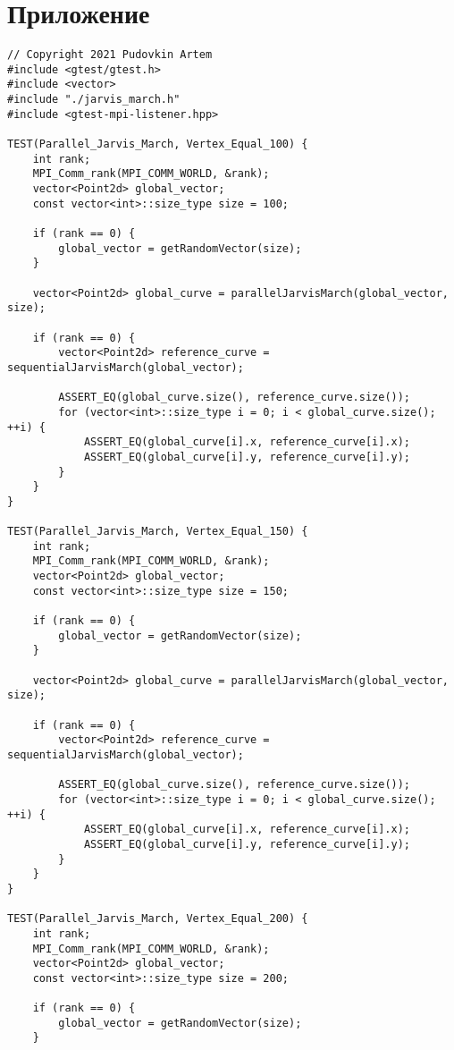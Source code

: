 \documentclass{report}
\begin{document}
\section*{Приложение}
\begin{lstlisting}
// Copyright 2021 Pudovkin Artem
#include <gtest/gtest.h>
#include <vector>
#include "./jarvis_march.h"
#include <gtest-mpi-listener.hpp>

TEST(Parallel_Jarvis_March, Vertex_Equal_100) {
    int rank;
    MPI_Comm_rank(MPI_COMM_WORLD, &rank);
    vector<Point2d> global_vector;
    const vector<int>::size_type size = 100;

    if (rank == 0) {
        global_vector = getRandomVector(size);
    }

    vector<Point2d> global_curve = parallelJarvisMarch(global_vector, size);

    if (rank == 0) {
        vector<Point2d> reference_curve = sequentialJarvisMarch(global_vector);

        ASSERT_EQ(global_curve.size(), reference_curve.size());
        for (vector<int>::size_type i = 0; i < global_curve.size(); ++i) {
            ASSERT_EQ(global_curve[i].x, reference_curve[i].x);
            ASSERT_EQ(global_curve[i].y, reference_curve[i].y);
        }
    }
}

TEST(Parallel_Jarvis_March, Vertex_Equal_150) {
    int rank;
    MPI_Comm_rank(MPI_COMM_WORLD, &rank);
    vector<Point2d> global_vector;
    const vector<int>::size_type size = 150;

    if (rank == 0) {
        global_vector = getRandomVector(size);
    }

    vector<Point2d> global_curve = parallelJarvisMarch(global_vector, size);

    if (rank == 0) {
        vector<Point2d> reference_curve = sequentialJarvisMarch(global_vector);

        ASSERT_EQ(global_curve.size(), reference_curve.size());
        for (vector<int>::size_type i = 0; i < global_curve.size(); ++i) {
            ASSERT_EQ(global_curve[i].x, reference_curve[i].x);
            ASSERT_EQ(global_curve[i].y, reference_curve[i].y);
        }
    }
}

TEST(Parallel_Jarvis_March, Vertex_Equal_200) {
    int rank;
    MPI_Comm_rank(MPI_COMM_WORLD, &rank);
    vector<Point2d> global_vector;
    const vector<int>::size_type size = 200;

    if (rank == 0) {
        global_vector = getRandomVector(size);
    }


\end{lstlisting}
\end{document}
